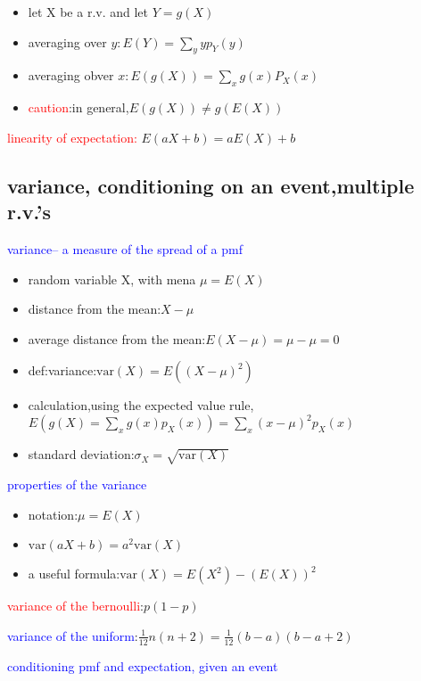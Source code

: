 \begin{itemize}
    \item let X be a r.v. and let $Y=g(X)$
    \item averaging over $y:E(Y)=\sum_y yp_Y(y)$
    \item averaging obver $x:E(g(X))=\sum_xg(x)P_X(x)$
    \item \textcolor{red}{caution}:in general,$E(g(X))\neq g(E(X))$
\end{itemize}


\textcolor{red}{linearity of expectation:}
$E(aX+b)=aE(X)+b$





\subsection*{variance, conditioning on an event,multiple r.v.'s}

\textcolor{blue}{variance-- a measure of the spread of a pmf}

\begin{itemize}
    \item random variable X, with mena $\mu = E(X)$
    \item distance from the mean:$X-\mu$
    \item average distance from the mean:$E(X-\mu)=\mu - \mu =0$
    \item def:variance:$\text{var}(X)=E((X-\mu)^2)$
    \item calculation,using the expected value rule, $E(g(X)=\sum_xg(x)p_X(x))=\sum_x(x-\mu)^2p_X(x)$
    \item standard deviation:$\sigma_X=\sqrt{\text{var}(X)}$
\end{itemize}

\textcolor{blue}{properties of the variance}

\begin{itemize}
    \item notation:$\mu=E(X)$
    \item $\text{var}(aX+b)=a^2\text{var}(X)$
    \item a useful formula:$\text{var}(X)=E(X^2)-(E(X))^2$
\end{itemize}


\textcolor{red}{variance of the bernoulli}:$p(1-p)$

\textcolor{blue}{variance of the uniform}:$\frac{1}{12}n(n+2)=\frac{1}{12}(b-a)(b-a+2)$


\textcolor{blue}{conditioning pmf and expectation, given an event}

